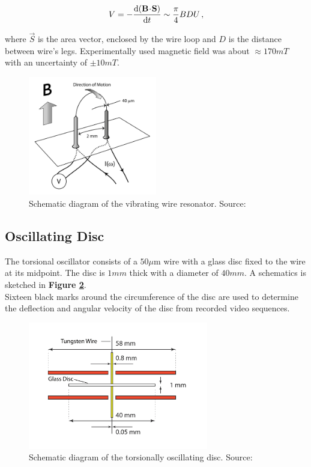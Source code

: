 \begin{equation}
V = - \frac{\text{d} (\mathbf{B} \!\cdot\! \mathbf{S})}{\text{d} t}
\sim \frac{\pi}{4} BDU\,,
\end{equation}

where $\vec{S}$ is the area vector, enclosed by the wire loop and $D$ is the distance between wire's legs. Experimentally used magnetic field was about $\approx 170 \unit{mT}$ with an uncertainty of $\pm 10 \unit{mT}$.

\begin{figure}[h]
	\centering
	\includegraphics[width=0.5\textwidth]{graphics/exp/wire}
	\caption{Schematic diagram of the vibrating wire resonator. Source: \cite{universal_scaling}}
	\label{wire}
\end{figure}

\newpage

\subsection{Oscillating Disc}

The torsional oscillator consists of a $50 \mu\text{m}$ wire  with a glass disc fixed to
the wire at its midpoint. The disc is $1\unit{mm}$ thick with a diameter of $40\unit{mm}$. A schematics is sketched in \textbf{Figure \ref{disc}}.\\
Sixteen black marks around the circumference of the disc are used to determine the deflection and angular velocity of the disc from recorded video sequences.

\begin{figure}[h]
	\centering
	\includegraphics[width=0.7\textwidth]{graphics/exp/disc}
	\caption{Schematic diagram of the torsionally oscillating disc. Source: \cite{universal_scaling}}
	\label{disc}
\end{figure}

